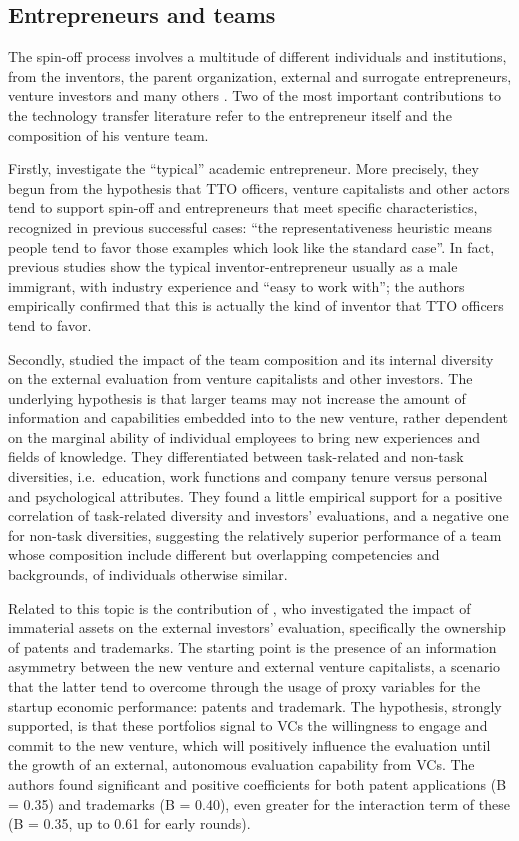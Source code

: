 \subsection{Entrepreneurs and teams}

The spin-off process involves a multitude of different individuals and institutions, from the inventors, the parent organization, external and surrogate entrepreneurs, venture investors and many others \citep{Djokovic2008}. Two of the most important contributions to the technology transfer literature refer to the entrepreneur itself and the composition of his venture team.

Firstly, \citet{Shane2015} investigate the \enquote{typical} academic entrepreneur. More precisely, they begun from the hypothesis that TTO officers, venture capitalists and other actors tend to support spin-off and entrepreneurs that meet specific characteristics, recognized in previous successful cases: \enquote{the representativeness heuristic means people tend to favor those examples which look like the standard case}. In fact, previous studies show the typical inventor-entrepreneur usually as a male immigrant, with industry experience and \enquote{easy to work with}; the authors empirically confirmed that this is actually the kind of inventor that TTO officers tend to favor.

Secondly, \citet{DerFoo2005} studied the impact of the team composition and its internal diversity on the external evaluation from venture capitalists and other investors. The underlying hypothesis is that larger teams may not increase the amount of information and capabilities embedded into to the new venture, rather dependent on the marginal ability of individual employees to bring new experiences and fields of knowledge. They differentiated between task-related and non-task diversities, i.e.\ education, work functions and company tenure versus personal and psychological attributes. They found a little empirical support for a positive correlation of task-related diversity and investors' evaluations, and a negative one for non-task diversities, suggesting the relatively superior performance of a team whose composition include different but overlapping competencies and backgrounds, of individuals otherwise similar.

Related to this topic is the contribution of \citet{Zhou2014}, who investigated the impact of immaterial assets on the external investors' evaluation, specifically the ownership of patents and trademarks. The starting point is the presence of an information asymmetry between the new venture and external venture capitalists, a scenario that the latter tend to overcome through the usage of proxy variables for the startup economic performance: patents and trademark. The hypothesis, strongly supported, is that these portfolios signal to VCs the willingness to engage and commit to the new venture, which will positively influence the evaluation until the growth of an external, autonomous evaluation capability from VCs. The authors found significant and positive coefficients for both patent applications (B = 0.35) and trademarks (B = 0.40), even greater for the interaction term of these (B = 0.35, up to 0.61 for early rounds).


